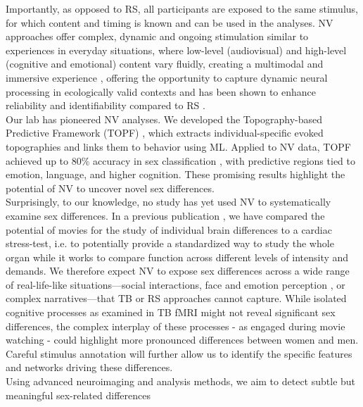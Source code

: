 \documentclass[11pt,a4paper]{article}
\begin{document}
Importantly, as opposed to RS, all participants are exposed to the same stimulus, 
for which content and timing 
is known and can be used in the analyses.
NV approaches offer complex, dynamic and ongoing stimulation similar 
to experiences in everyday situations, where low-level (audiovisual) and high-level (cognitive and emotional) 
content vary fluidly, creating a multimodal and immersive experience 
\parencite{sonkusareNaturalisticStimuliNeuroscience2019}, offering the 
opportunity to capture dynamic neural processing in ecologically valid contexts 
\parencite{vanderwalMoviesMagnetNaturalistic2019} and has been shown to enhance reliability and 
identifiability compared to RS \parencite{krollNaturalisticViewingIncreases2023}.\\
Our lab has pioneered NV analyses. We developed the Topography-based Predictive Framework (TOPF) 
\parencite{liTopographybasedPredictiveFramework2023a}, which extracts individual-specific evoked 
topographies and links them to behavior using ML. 
Applied to NV data, TOPF achieved up to 80\% accuracy in 
sex classification \parencite{liStimulusSelectionInfluences2025a}, with predictive regions tied to emotion, language, and higher cognition. 
These promising results highlight the potential of NV to uncover novel sex differences.\\
Surprisingly, to our knowledge, no study has yet used NV to systematically examine sex differences. 
In a previous publication \parencite{eickhoffClinicalApplicationsMovie2020a}, we have compared the potential of 
movies for the study of 
individual brain differences to a cardiac stress-test, 
i.e. to potentially provide a standardized way to study the whole organ while it works to compare function 
across different levels of intensity and demands. 
We therefore expect NV to expose sex differences across a wide range of real-life-like situations—social interactions, 
face and emotion perception \parencite{sonkusareNaturalisticStimuliNeuroscience2019}, 
or complex narratives—that TB or RS approaches cannot capture. 
While isolated cognitive processes as examined in TB fMRI might not reveal 
significant sex differences, the complex interplay of these processes - as engaged during movie watching - could 
highlight more pronounced differences between women and men. 
Careful stimulus annotation will further allow us to identify the specific features and networks driving these differences.\\
Using advanced neuroimaging and analysis methods, we aim to detect subtle but meaningful sex-related differences 
\end{document}
